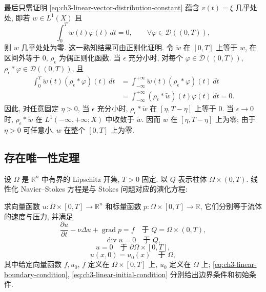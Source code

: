 \begin{Proof}
最后只需证明 \eqref{eq:ch3-linear-vector-distribution-constant} 蕴含 $v(t)=\xi$ 几乎处处, 即若 $w\in L^1(X)$ 且
\begin{equation}
\int_0^T w(t)\varphi(t)\,dt=0,
\qquad\forall\varphi\in\mathcal D((0,T)),
\label{eq:ch3-linear-zero-vector-distribution}
\end{equation}
则 $w$ 几乎处处为零. 这一熟知结果可由正则化证明. 令 $\widetilde w$ 在 $[0,T]$ 上等于 $w$, 在区间外等于 $0$, $\rho_\epsilon$ 为偶正则化函数. 当 $\epsilon$ 充分小时, 对每个 $\varphi\in\mathcal D((0,T))$, $\rho_\epsilon*\varphi\in\mathcal D((0,T))$, 且
\[
\begin{aligned}
\int_0^T\widetilde w(t)(\rho_\epsilon*\varphi)(t)\,dt
&=\int_{-\infty}^{+\infty}\widetilde w(t)(\rho_\epsilon*\varphi)(t)\,dt\\
&=\int_{-\infty}^{+\infty}(\rho_\epsilon*\widetilde w)(t)\varphi(t)\,dt=0.
\end{aligned}
\]
因此, 对任意固定 $\eta>0$, 当 $\epsilon$ 充分小时, $\rho_\epsilon*\widetilde w$ 在 $[\eta,T-\eta]$ 上等于 $0$. 当 $\epsilon\to0$ 时, $\rho_\epsilon*\widetilde w$ 在 $L^1(-\infty,+\infty;X)$ 中收敛于 $\widetilde w$. 因而 $w$ 在 $[\eta,T-\eta]$ 上为零; 由于 $\eta>0$ 可任意小, $w$ 在整个 $[0,T]$ 上为零.
\end{Proof}

\hypertarget{chapter-03-page-186}{}
\subsection{存在唯一性定理}
\label{subsec:ch3-linear-existence-uniqueness}
设 $\Omega$ 是 $\mathbb R^n$ 中有界的 Lipschitz 开集, $T>0$ 固定. 以 $Q$ 表示柱体 $\Omega\times(0,T)$. 线性化 Navier--Stokes 方程是与 Stokes 问题对应的演化方程:

求向量函数 $u:\Omega\times[0,T]\to\mathbb R^n$ 和标量函数 $p:\Omega\times[0,T]\to\mathbb R$, 它们分别等于流体的速度与压力, 并满足
\begin{equation}
\frac{\partial u}{\partial t}-\nu\Delta u+\operatorname{grad}p=f
\quad\text{于 }Q=\Omega\times(0,T),
\label{eq:ch3-linear-momentum}
\end{equation}
\begin{equation}
\operatorname{div}u=0\quad\text{于 }Q,
\label{eq:ch3-linear-incompressibility}
\end{equation}
\begin{equation}
u=0\quad\text{于 }\partial\Omega\times[0,T],
\label{eq:ch3-linear-boundary-condition}
\end{equation}
\begin{equation}
u(x,0)=u_0(x)\quad\text{于 }\Omega,
\label{eq:ch3-linear-initial-condition}
\end{equation}
其中给定向量函数 $f,u_0$, $f$ 定义在 $\Omega\times[0,T]$ 上, $u_0$ 定义在 $\Omega$ 上; \eqref{eq:ch3-linear-boundary-condition}, \eqref{eq:ch3-linear-initial-condition} 分别给出边界条件和初始条件.

